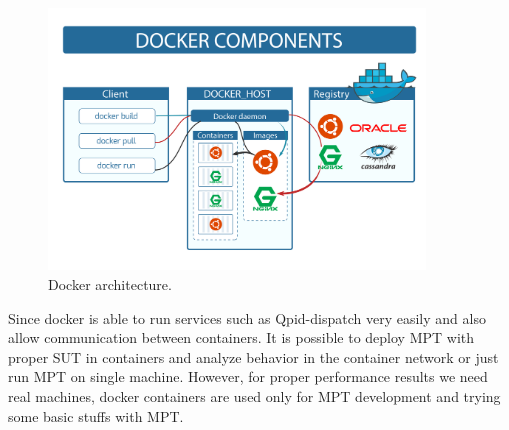\begin{figure}[H]
  \centering
  \includegraphics[width=10cm]{obrazky-figures/docker.png}
  \caption{Docker architecture. }
  \label{fig:ansible_architecture}
\end{figure}


Since docker is able to run services such as Qpid-dispatch very easily and also allow communication between containers. It is possible to deploy MPT with proper SUT in containers and analyze behavior in the container network or just run MPT on single machine. However, for proper performance results we need real machines, docker containers are used only for MPT development and trying some basic stuffs with MPT.

